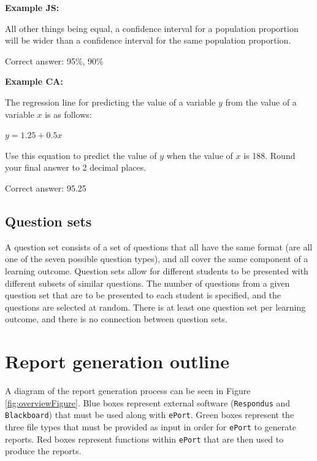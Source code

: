 \documentclass[11pt,a4paper,oldfontcommands,openany]{memoir}
\numberwithin{equation}{section} %
\begin{document}
\begin{framed}
\textbf{Example JS:}

All other things being equal, a \underline{\hspace{2cm}} confidence interval for a population proportion will be wider than a \underline{\hspace{2cm}} confidence interval for the same population proportion.

Correct answer: 95\%, 90\%
\end{framed}

\begin{framed}
\textbf{Example CA:}

The regression line for predicting the value of a variable $y$ from the value of a variable $x$ is as follows:

$y = 1.25 + 0.5x$

Use this equation to predict the value of $y$ when the value of $x$ is 188. Round your final answer to 2 decimal places.

Correct answer: 95.25
\end{framed}

\subsection{Question sets}

A question set consists of a set of questions that all have the same format (are all one of the seven possible question types), and all cover the same component of a learning outcome. Question sets allow for different students to be presented with different subsets of similar questions. The number of questions from a given question set that are to be presented to each student is specified, and the questions are selected at random. There is at least one question set per learning outcome, and there is no connection between question sets.

\section{Report generation outline}

A diagram of the report generation process can be seen in Figure \ref{fig:overviewFigure}. Blue boxes represent external software (\texttt{Respondus} and \texttt{Blackboard}) that must be used along with \texttt{ePort}. Green boxes represent the three file types that must be provided as input in order for \texttt{ePort} to generate reports. Red boxes represent functions within \texttt{ePort} that are then used to produce the reports.
\end{document}
